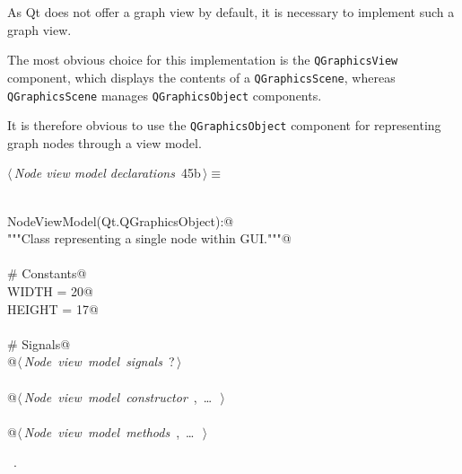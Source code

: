 \documentclass[
    a4paper,      %
    10pt,         %
    openright,    %
    notitlepage,  %
    parskip=half, %
]{scrreprt}       %
\theoremstyle{definition}                    %
\begin{document}
As Qt does not offer a graph view by default, it is necessary to implement such
a graph view.

The most obvious choice for this implementation is the
\verb+QGraphicsView+ component, which displays the contents of a
\verb+QGraphicsScene+, whereas \verb+QGraphicsScene+ manages \verb+QGraphicsObject+
components.

It is therefore obvious to use the \verb+QGraphicsObject+ component
for representing graph nodes through a view model.

\begin{flushleft} \small
\begin{minipage}{\linewidth}\label{scrap59}\raggedright\small
{} $\langle\,${\itshape Node view model declarations}\nobreak\ {\footnotesize {45b}}$\,\rangle\equiv$
\vspace{-1ex}
\begin{list}{}{} \item
\mbox{}\lstinline@@\\
\mbox{}\lstinline@class NodeViewModel(Qt.QGraphicsObject):@\\
\mbox{}\lstinline@    """Class representing a single node within GUI."""@\\
\mbox{}\lstinline@@\\
\mbox{}\lstinline@    # Constants@\\
\mbox{}\lstinline@    WIDTH = 20@\\
\mbox{}\lstinline@    HEIGHT = 17@\\
\mbox{}\lstinline@@\\
\mbox{}\lstinline@    # Signals@\\
\mbox{}\lstinline@    @\hbox{$\langle\,${\itshape Node view model signals}\nobreak\ {\footnotesize ?}$\,\rangle$}\lstinline@@\\
\mbox{}\lstinline@@\\
\mbox{}\lstinline@    @\hbox{$\langle\,${\itshape Node view model constructor}\nobreak\ {\footnotesize {}, \ldots\ }$\,\rangle$}\lstinline@@\\
\mbox{}\lstinline@@\\
\mbox{}\lstinline@    @\hbox{$\langle\,${\itshape Node view model methods}\nobreak\ {\footnotesize {}, \ldots\ }$\,\rangle$}\lstinline@@\\
\mbox{}\lstinline@@{\NWsep}
\end{list}
\vspace{-1.5ex}
\footnotesize
\begin{list}{}{\setlength{\itemsep}{-\parsep}\setlength{\itemindent}{-\leftmargin}}
\item \NWtxtMacroRefIn\ .

\item{}
\end{list}
\end{minipage}\vspace{4ex}
\end{flushleft}
\end{document}
